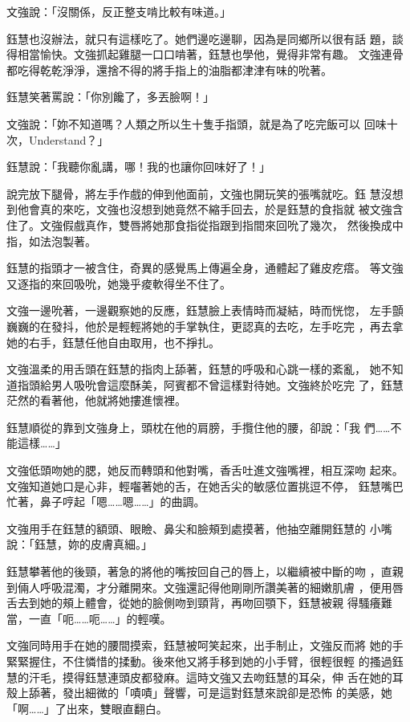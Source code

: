 文強說：「沒關係，反正整支啃比較有味道。」

鈺慧也沒辦法，就只有這樣吃了。她們邊吃邊聊，因為是同鄉所以很有話
題，談得相當愉快。文強抓起雞腿一口口啃著，鈺慧也學他，覺得非常有趣。
文強連骨都吃得乾乾淨淨，還捨不得的將手指上的油脂都津津有味的吮著。

鈺慧笑著罵說：「你別饞了，多丟臉啊！」

文強說：「妳不知道嗎？人類之所以生十隻手指頭，就是為了吃完飯可以
回味十次，Understand？」

鈺慧說：「我聽你亂講，哪！我的也讓你回味好了！」

說完放下腿骨，將左手作戲的伸到他面前，文強也開玩笑的張嘴就吃。鈺
慧沒想到他會真的來吃，文強也沒想到她竟然不縮手回去，於是鈺慧的食指就
被文強含住了。文強假戲真作，雙唇將她那食指從指跟到指間來回吮了幾次，
然後換成中指，如法泡製著。

鈺慧的指頭才一被含住，奇異的感覺馬上傳遍全身，通體起了雞皮疙瘩。
等文強又逐指的來回吸吮，她幾乎痠軟得坐不住了。

文強一邊吮著，一邊觀察她的反應，鈺慧臉上表情時而凝結，時而恍惚，
左手顫巍巍的在發抖，他於是輕輕將她的手掌執住，更認真的去吃，左手吃完
，再去拿她的右手，鈺慧任他自由取用，也不掙扎。

文強溫柔的用舌頭在鈺慧的指肉上舔著，鈺慧的呼吸和心跳一樣的紊亂，
她不知道指頭給男人吸吮會這麼酥美，阿賓都不曾這樣對待她。文強終於吃完
了，鈺慧茫然的看著他，他就將她摟進懷裡。

鈺慧順從的靠到文強身上，頭枕在他的肩膀，手攬住他的腰，卻說：「我
們……不能這樣……」

文強低頭吻她的腮，她反而轉頭和他對嘴，香舌吐進文強嘴裡，相互深吻
起來。文強知道她口是心非，輕囓著她的舌，在她舌尖的敏感位置挑逗不停，
鈺慧嘴巴忙著，鼻子哼起「嗯……嗯……」的曲調。

文強用手在鈺慧的額頭、眼瞼、鼻尖和臉頰到處摸著，他抽空離開鈺慧的
小嘴說：「鈺慧，妳的皮膚真細。」

鈺慧攀著他的後頸，著急的將他的嘴按回自己的唇上，以繼續被中斷的吻
，直親到倆人呼吸混濁，才分離開來。文強還記得他剛剛所讚美著的細嫩肌膚
，便用唇舌去到她的頰上體會，從她的臉側吻到頸背，再吻回顎下，鈺慧被親
得騷癢難當，一直「呃……呃……」的輕嘆。

文強同時用手在她的腰間摸索，鈺慧被呵笑起來，出手制止，文強反而將
她的手緊緊握住，不住憐惜的揉動。後來他又將手移到她的小手臂，很輕很輕
的搔過鈺慧的汗毛，摸得鈺慧連頭皮都發麻。這時文強又去吻鈺慧的耳朵，伸
舌在她的耳殼上舔著，發出細微的「嘖嘖」聲響，可是這對鈺慧來說卻是恐怖
的美感，她「啊……」了出來，雙眼直翻白。

